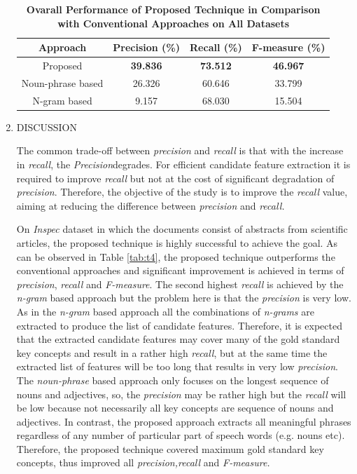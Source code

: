 \documentclass{ieeeaccess}
\begin{document}
\begin{enumerate}
\begin{table}[!h]
\centering
\caption{\textbf{Ovarall Performance of Proposed Technique in Comparison with Conventional Approaches on All Datasets}}
\label{tab:t5}
\setlength{\tabcolsep}{4.5pt}
\begin{tabular}{|c|c|c|c|} 
\hline
\textbf{Approach} & \textbf{Precision (\%)} & \textbf{Recall (\%)} & \textbf{F-measure (\%)}  \\ 
\hline
Proposed          & \textbf{39.836}         & \textbf{73.512}      & \textbf{46.967}          \\ 
\hline
Noun-phrase based & 26.326                  & 60.646               & 33.799                   \\ 
\hline
N-gram based      & 9.157                   & 68.030               & 15.504                   \\
\hline
\end{tabular}
\end{table}

	\item
{DISCUSSION}

The common trade-off between \textit{precision} and \textit{recall} is that with the increase in \textit{recall}, the \textit{Precision}degrades. For  efficient candidate feature extraction it is required to improve \textit{recall} but not at the cost of significant degradation of \textit{precision}. Therefore, the objective of the study is to improve the \textit{recall} value, aiming at reducing the difference between \textit{precision} and \textit{recall.}

\hspace{1ex}On \textit{Inspec} dataset in which the documents consist of abstracts from scientific articles, the proposed technique is highly successful to achieve the goal. As can be observed in Table \ref{tab:t4}, the proposed technique outperforms the conventional approaches and significant improvement is achieved in terms of \textit{precision}, \textit{recall} and \textit{F-measure}. The second highest \textit{recall} is achieved by the \textit{n-gram} based approach but the problem here is that the \textit{precision} is very low. As in the \textit{n-gram} based approach all the combinations of \textit{n-grams} are extracted to produce the list of candidate features. Therefore, it is expected that the extracted candidate features may cover many of the gold standard key concepts and result in a rather high \textit{recall}, but at the same time the extracted list of features will be too long that results in very low \textit{precision}. The \textit{noun-phrase} based approach only focuses on the longest sequence of nouns and adjectives, so, the \textit{precision} may be rather high but the \textit{recall} will be low because not necessarily all key concepts are sequence of nouns and adjectives. In contrast, the proposed approach extracts all meaningful phrases regardless of any number of particular part of speech words (e.g. nouns etc). Therefore, the proposed technique covered maximum gold standard key concepts, thus improved all  \textit{precision,recall} and \textit{F-measure.}


\end{enumerate}
\end{document}
